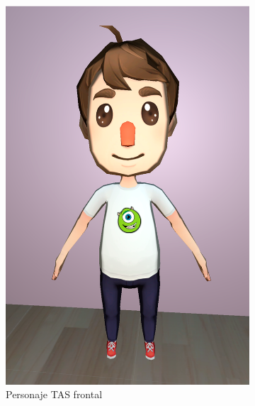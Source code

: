 \documentclass[12pt, a4paper,twoside,titlepage]{book}
\begin{document}
 \begin{figure}
\centering
\begin{subfigure}{.5\textwidth}
  \centering
  \includegraphics[width=.95\linewidth]{TGF/Artes/TAS_front.png}
  \caption{Personaje TAS frontal}
\end{subfigure}%
\begin{subfigure}{.5\textwidth}
  \centering

\end{subfigure}
\end{figure}
\end{document}

